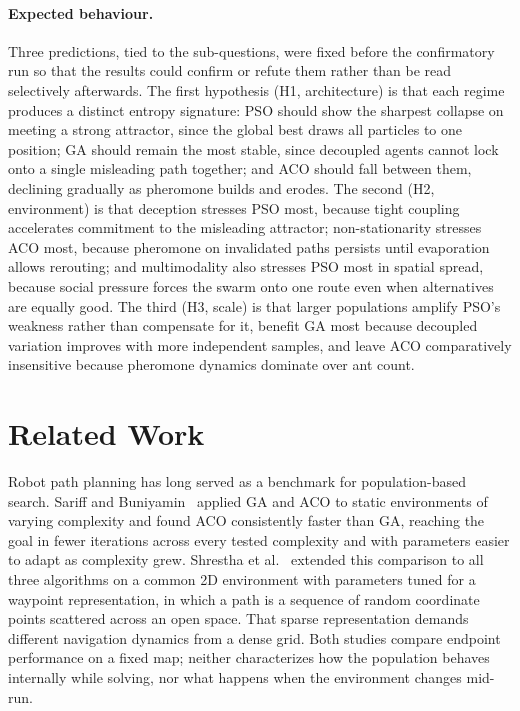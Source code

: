 \documentclass[11pt,a4paper]{article}
\begin{document}
    \paragraph{Expected behaviour.}
    Three predictions, tied to the sub-questions, were fixed before the confirmatory run so that the results could confirm or refute them rather than be read selectively afterwards. The first hypothesis (H1, architecture) is that each regime produces a distinct entropy signature: PSO should show the sharpest collapse on meeting a strong attractor, since the global best draws all particles to one position; GA should remain the most stable, since decoupled agents cannot lock onto a single misleading path together; and ACO should fall between them, declining gradually as pheromone builds and erodes. The second (H2, environment) is that deception stresses PSO most, because tight coupling accelerates commitment to the misleading attractor; non-stationarity stresses ACO most, because pheromone on invalidated paths persists until evaporation allows rerouting; and multimodality also stresses PSO most in spatial spread, because social pressure forces the swarm onto one route even when alternatives are equally good. The third (H3, scale) is that larger populations amplify PSO's weakness rather than compensate for it, benefit GA most because decoupled variation improves with more independent samples, and leave ACO comparatively insensitive because pheromone dynamics dominate over ant count.

    \section{Related Work}
    Robot path planning has long served as a benchmark for population-based search. Sariff and Buniyamin~\cite{sariff2009} applied GA and ACO to static environments of varying complexity and found ACO consistently faster than GA, reaching the goal in fewer iterations across every tested complexity and with parameters easier to adapt as complexity grew. Shrestha et al.~\cite{shrestha2024} extended this comparison to all three algorithms on a common 2D environment with parameters tuned for a waypoint representation, in which a path is a sequence of random coordinate points scattered across an open space. That sparse representation demands different navigation dynamics from a dense grid. Both studies compare endpoint performance on a fixed map; neither characterizes how the population behaves internally while solving, nor what happens when the environment changes mid-run.
\end{document}
